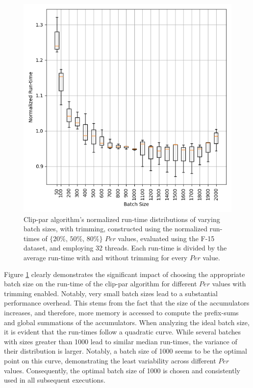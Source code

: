\documentclass{egpubl}
\begin{document}
\begin{figure}[H]
    \centering
    \includegraphics[width=\linewidth]{./Figures/Batch-Size}
    \caption{Clip-par algorithm's normalized run-time distributions of varying batch sizes, with trimming, constructed using the normalized run-times of  $\textit{\{20\%, 50\%, 80\%\}}$ $Per$ values, evaluated using the F-15 dataset, and employing 32 threads. Each run-time is divided by the average run-time with and without trimming for every $Per$ value.
    }
    \label{fig:batch-size}
\end{figure}

Figure \ref{fig:batch-size} clearly demonstrates the significant impact of choosing the appropriate batch size on the run-time of the clip-par algorithm for different $Per$ values with trimming enabled. Notably, very small batch sizes lead to a substantial performance overhead. This stems from the fact that the size of the accumulators increases, and therefore, more memory is accessed to compute the prefix-sums and global summations of the accumulators. When analyzing the ideal batch size, it is evident that the run-times follow a quadratic curve. While several batches with sizes greater than 1000 lead to similar median run-times, the variance of their distribution is larger. Notably, a batch size of 1000 seems to be the optimal point on this curve, demonstrating the least variability across different $Per$ values. Consequently, the optimal batch size of 1000 is chosen and consistently used in all subsequent executions.
\end{document}
